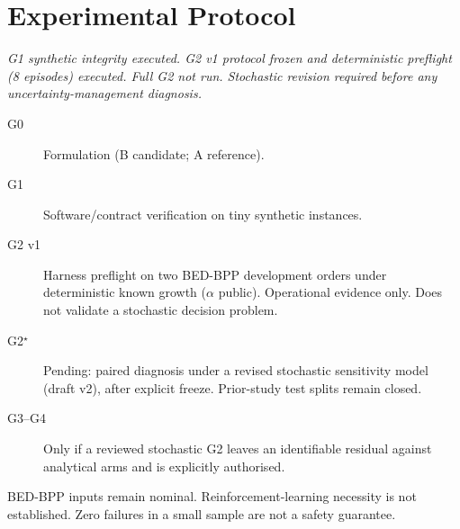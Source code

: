 \section{Experimental Protocol}

\textit{G1 synthetic integrity executed. G2 v1 protocol frozen and deterministic
preflight (8 episodes) executed. Full G2 not run. Stochastic revision required
before any uncertainty-management diagnosis.}

\begin{description}
  \item[G0] Formulation (B candidate; A reference).
  \item[G1] Software/contract verification on tiny synthetic instances.
  \item[G2 v1] Harness preflight on two BED-BPP development orders under
  deterministic known growth ($\alpha$ public). Operational evidence only.
  Does not validate a stochastic decision problem.
  \item[G2$^\star$] Pending: paired diagnosis under a revised stochastic
  sensitivity model (draft v2), after explicit freeze. Prior-study test splits
  remain closed.
  \item[G3--G4] Only if a reviewed stochastic G2 leaves an identifiable residual
  against analytical arms and is explicitly authorised.
\end{description}

BED-BPP inputs remain nominal. Reinforcement-learning necessity is not
established. Zero failures in a small sample are not a safety guarantee.
